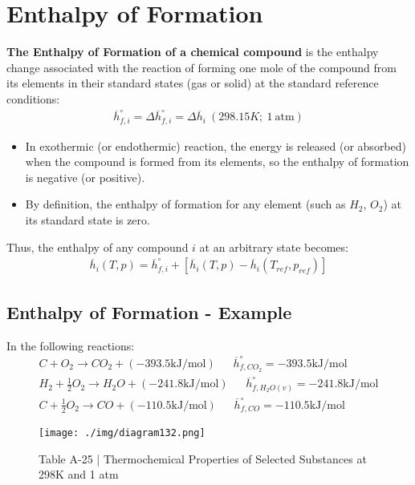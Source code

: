 \section{Enthalpy of Formation}
\textbf{The Enthalpy of Formation of a chemical compound} is the enthalpy change associated with the reaction of forming one mole of the compound from its elements in their standard states (gas or solid) at the standard reference conditions:
\begin{gather}
  \overline{h}_{f,i}^\circ = \Delta \overline{h}_{f,i}^\circ = \Delta \overline{h}_i \ (298.15K;\ 1\ \text{atm})
\end{gather}
\begin{itemize}[noitemsep]
  \item In exothermic (or endothermic) reaction, the energy is released (or absorbed) when the compound is formed from its elements, so the enthalpy of formation is negative (or positive).
  \item By definition, the enthalpy of formation for any element (such as $H_2$, $O_2$) at its standard state is zero.
\end{itemize}
Thus, the enthalpy of any compound $i$ at an arbitrary state becomes:
\begin{gather}
  \overline{h}_{i}(T,p) = \overline{h}_{f,i}^\circ + \left[\overline{h}_{i}(T,p) - \overline{h}_{i}(T_{ref},p_{ref})\right]
\end{gather}
\subsection{Enthalpy of Formation - Example}
In the following reactions:
\begin{gather}
  C + O_2 \longrightarrow CO_2 + (-393.5 \si{\kilo\joule\per\mole}) \ \ \ \ \ \ \ \overline{h}_{f,CO_2}^\circ = -393.5 \si{\kilo\joule\per\mole} \\[5pt]
  H_2 + \frac{1}{2}O_2 \longrightarrow H_2O + (-241.8 \si{\kilo\joule\per\mole}) \ \ \ \ \ \ \ \overline{h}_{f,H_2O(v)}^\circ = -241.8 \si{\kilo\joule\per\mole} \\[5pt]
  C + \frac{1}{2}O_2 \longrightarrow CO + (-110.5 \si{\kilo\joule\per\mole}) \ \ \ \ \ \ \ \overline{h}_{f,CO}^\circ = -110.5 \si{\kilo\joule\per\mole}
\end{gather}
\begin{figure}[H]
  \centering
  \texttt{[image: ./img/diagram132.png]}
  \caption{Table A-25 | Thermochemical Properties of Selected Substances at 298K and 1 atm}
\end{figure}
